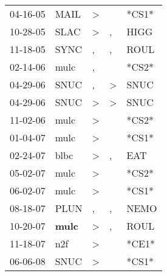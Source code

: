 \begin{supertabular}{p{0.07\textwidth}p{0.06\textwidth}p{0.02\textwidth}p{0.02\textwidth}p{0.06\textwidth}}
 04-16-05\textsuperscript{} &           MAIL\textsuperscript{} &     \textgreater &               &                   *CS1* \\
 10-28-05\textsuperscript{} &           SLAC\textsuperscript{} &     \textgreater &             , &  HIGG\textsuperscript{} \\
 11-18-05\textsuperscript{} &           SYNC\textsuperscript{} &                , &             , &  ROUL\textsuperscript{} \\
 02-14-06\textsuperscript{} &           mulc\textsuperscript{} &                , &               &                   *CS2* \\
 04-29-06\textsuperscript{} &           SNUC\textsuperscript{} &                , &  \textgreater &  SNUC\textsuperscript{} \\
 04-29-06\textsuperscript{} &           SNUC\textsuperscript{} &     \textgreater &  \textgreater &  SNUC\textsuperscript{} \\
 11-02-06\textsuperscript{} &           mulc\textsuperscript{} &     \textgreater &               &                   *CS2* \\
 01-04-07\textsuperscript{} &           mulc\textsuperscript{} &     \textgreater &               &                   *CS1* \\
 02-24-07\textsuperscript{} &           blbc\textsuperscript{} &     \textgreater &             , &   EAT\textsuperscript{} \\
 05-02-07\textsuperscript{} &           mulc\textsuperscript{} &     \textgreater &               &                   *CS2* \\
 06-02-07\textsuperscript{} &           mulc\textsuperscript{} &     \textgreater &               &                   *CS1* \\
 08-18-07\textsuperscript{} &           PLUN\textsuperscript{} &                , &             , &  NEMO\textsuperscript{} \\
 10-20-07\textsuperscript{} &  \textbf{mulc\textsuperscript{}} &     \textgreater &             , &  ROUL\textsuperscript{} \\
 11-18-07\textsuperscript{} &            n2f\textsuperscript{} &     \textgreater &               &                   *CE1* \\
 06-06-08\textsuperscript{} &           SNUC\textsuperscript{} &     \textgreater &               &                   *CS1* \\

\end{supertabular}

